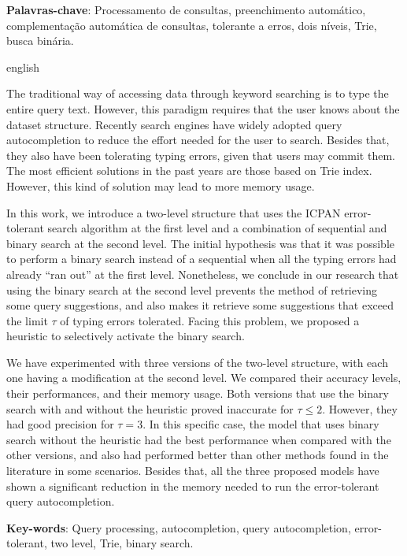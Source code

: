 \documentclass[
	12pt,				%
	openright,			%
	twoside,			%
	a4paper,			%
	english,			%
	spanish,			%
	brazil,				%
	]{abntex2}
\begin{document}
\begin{resumo}
\vspace{\onelineskip}
\noindent
\textbf{Palavras-chave}: Processamento de consultas, preenchimento automático, complementação automática de consultas, tolerante a erros, dois níveis, Trie, busca binária.
 

\end{resumo}

\begin{resumo}[Abstract]
 \begin{otherlanguage*}{english}

The traditional way of accessing data through keyword searching is to type the entire query text. However, this paradigm requires that the user knows about the dataset structure. Recently search engines have widely adopted query autocompletion to reduce the effort needed for the user to search. Besides that, they also have been tolerating typing errors, given that users may commit them. The most efficient solutions in the past years are those based on Trie index. However, this kind of solution may lead to more memory usage.

In this work, we introduce a two-level structure that uses the ICPAN error-tolerant search algorithm at the first level and a combination of sequential and binary search at the second level. The initial hypothesis was that it was possible to perform a binary search instead of a sequential when all the typing errors had already ``ran out'' at the first level. Nonetheless, we conclude in our research that using the binary search at the second level prevents the method of retrieving some query suggestions, and also makes it retrieve some suggestions that exceed the limit $\tau$ of typing errors tolerated. Facing this problem, we proposed a heuristic to selectively activate the binary search.

We have experimented with three versions of the two-level structure, with each one having a modification at the second level. We compared their accuracy levels, their performances, and their memory usage. Both versions that use the binary search with and without the heuristic proved inaccurate for $\tau \leq 2$. However, they had good precision for $\tau=3$. In this specific case, the model that uses binary search without the heuristic had the best performance when compared with the other versions, and also had performed better than other methods found in the literature in some scenarios. Besides that, all the three proposed models have shown a significant reduction in the memory needed to run the error-tolerant query autocompletion.


  \vspace{\onelineskip}
 
  \noindent 
  \textbf{Key-words}: Query processing, autocompletion, query autocompletion, error-tolerant, two level, Trie, binary search.
 \end{otherlanguage*}
\end{resumo}
\end{document}

